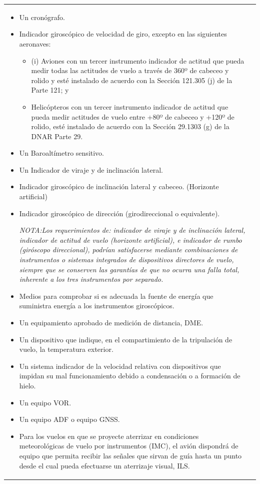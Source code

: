 \begin{longtable}{m{}m{}}
{\begin{itemize}
  \item Un cronógrafo.
  \item Indicador giroscópico de velocidad de giro, excepto en las siguientes aeronaves:
    \begin{itemize}
    \item (i) Aviones con un tercer instrumento indicador de actitud
      que pueda medir todas las actitudes de vuelo a través de 360º de
      cabeceo y rolido y esté instalado de acuerdo con la Sección
      121.305 (j) de la Parte 121; y
    \item Helicópteros con un tercer
      instrumento indicador de actitud que pueda medir actitudes de
      vuelo entre +80º de cabeceo y +120º de rolido, esté instalado
      de acuerdo con la Sección 29.1303 (g) de la DNAR Parte 29.
    \end{itemize}
  \item Un Baroaltímetro sensitivo.
  \item Un Indicador de viraje y de inclinación lateral.
  \item Indicador giroscópico de inclinación lateral y cabeceo. (Horizonte artificial)
  \item Indicador giroscópico de dirección (girodireccional o equivalente).

{\it NOTA:Los  requerimientos  de:  indicador  de  viraje  y  de  inclinación  lateral,  indicador  de  actitud  de  vuelo  (horizonte  artificial),  e  indicador  de  rumbo  (giróscopo  direccional),  podrían  satisfacerse  mediante  combinaciones de instrumentos o sistemas integrados de dispositivos directores de vuelo, siempre que se conserven las garantías de que no ocurra una falla total, inherente a los tres instrumentos por separado.}

\item Medios para comprobar si es adecuada la fuente de energía que suministra energía a los instrumentos giroscópicos.
\item Un equipamiento aprobado de medición de distancia, \ac{DME}.
\item Un dispositivo que indique, en el compartimiento de la tripulación de vuelo, la temperatura exterior.
\item Un sistema indicador de la velocidad relativa con dispositivos que impidan su mal funcionamiento debido a condensación o a formación de hielo.
\item Un equipo \ac{VOR}.
\item Un equipo \ac{ADF} o equipo \ac{GNSS}.
\item Para los vuelos en que se proyecte aterrizar en condiciones meteorológicas de vuelo por instrumentos (IMC), el avión dispondrá de equipo que permita recibir las señales que sirvan de guía hasta un punto desde el cual pueda efectuarse un aterrizaje visual, \ac{ILS}.  


\end{itemize}}
\end{longtable}
